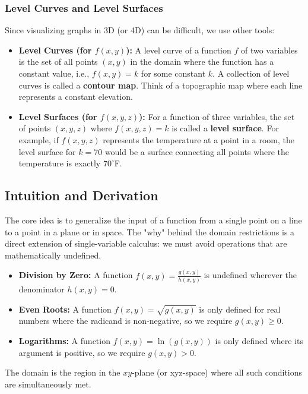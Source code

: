 \documentclass{article}
\begin{document}
\subsubsection{Level Curves and Level Surfaces}
Since visualizing graphs in 3D (or 4D) can be difficult, we use other tools:
\begin{itemize}
    \item \textbf{Level Curves (for $f(x, y)$):} A level curve of a function $f$ of two variables is the set of all points $(x, y)$ in the domain where the function has a constant value, i.e., $f(x, y) = k$ for some constant $k$. A collection of level curves is called a \textbf{contour map}. Think of a topographic map where each line represents a constant elevation.
    \item \textbf{Level Surfaces (for $f(x, y, z)$):} For a function of three variables, the set of points $(x, y, z)$ where $f(x, y, z) = k$ is called a \textbf{level surface}. For example, if $f(x, y, z)$ represents the temperature at a point in a room, the level surface for $k=70$ would be a surface connecting all points where the temperature is exactly $70^\circ$F.
\end{itemize}

\subsection{Intuition and Derivation}
The core idea is to generalize the input of a function from a single point on a line to a point in a plane or in space. The "why" behind the domain restrictions is a direct extension of single-variable calculus: we must avoid operations that are mathematically undefined.
\begin{itemize}
    \item \textbf{Division by Zero:} A function $f(x, y) = \frac{g(x, y)}{h(x, y)}$ is undefined wherever the denominator $h(x, y) = 0$.
    \item \textbf{Even Roots:} A function $f(x, y) = \sqrt{g(x, y)}$ is only defined for real numbers where the radicand is non-negative, so we require $g(x, y) \ge 0$.
    \item \textbf{Logarithms:} A function $f(x, y) = \ln(g(x, y))$ is only defined where its argument is positive, so we require $g(x, y) > 0$.
\end{itemize}
The domain is the region in the $xy$-plane (or xyz-space) where all such conditions are simultaneously met.
\end{document}

